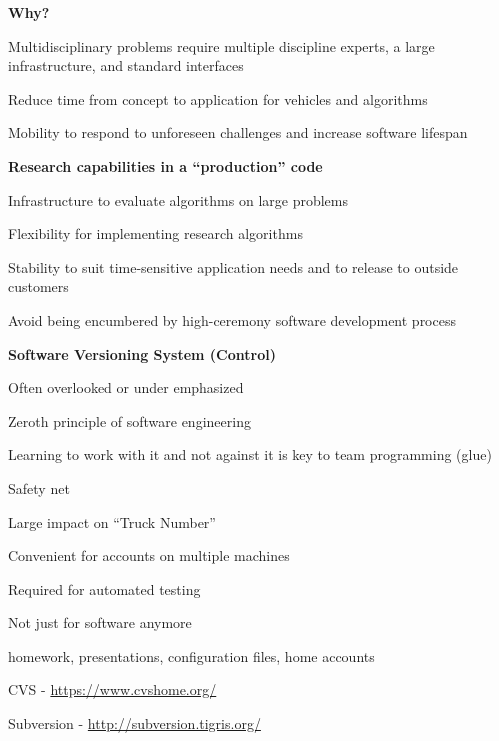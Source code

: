 \documentclass[landscape]{slides}
\renewcommand{\title}[1]{{\large\bfseries #1}}
\newenvironment{itemiz}%
  {\begin{list}{}{\raggedright
      \setlength{\itemsep}{2pt}%
      \setlength{\parskip}{4pt}\setlength{\parsep}{2pt}}}%
  {\end{list}}%
\begin{document}
 \begin{slide}
  \title{Why?}
  \begin{itemiz}
   \item Multidisciplinary problems require multiple discipline
   experts, a large infrastructure, and standard interfaces
   \vspace{6pt}
   \item Reduce time from concept to application for vehicles and algorithms
   \vspace{6pt}
   \item Mobility to respond to unforeseen challenges and increase
   software lifespan
  \end{itemiz}

  \title{Research capabilities in a ``production'' code}
  \begin{itemiz}
    \item Infrastructure to evaluate algorithms on large problems
    \item Flexibility for implementing research algorithms 
    \item Stability to suit time-sensitive application needs and to
    release to outside customers
    \item Avoid being encumbered by high-ceremony software development process
  \end{itemiz}
 \end{slide}
 
 \begin{slide}
  \title{Software Versioning System (Control)}
  \begin{itemiz}
    \item Often overlooked or under emphasized
    \item Zeroth principle of software engineering
    \item Learning to work with it and not against it is key to team
    programming (glue)
    \item Safety net
    \item Large impact on ``Truck Number''
    \item Convenient for accounts on multiple machines
    \item Required for automated testing
    \item Not just for software anymore
      \begin{itemiz} 
      \item homework, presentations, configuration files, home accounts
      \end{itemiz}
    \item CVS - \url{https://www.cvshome.org/}
    \item Subversion - \url{http://subversion.tigris.org/}
  \end{itemiz}
 \end{slide}
 
\end{document}
